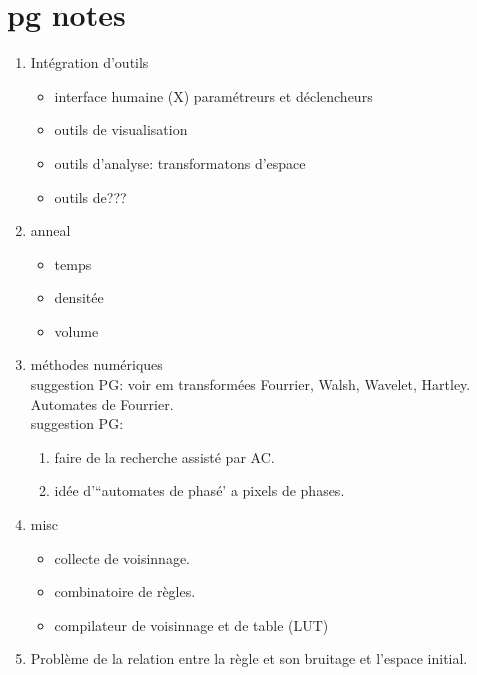 \chapter{pg notes}

\begin{enumerate}
        \item Int\'egration d'outils
        \begin{itemize}
                \item interface humaine (X) param\'etreurs et d\'eclencheurs
                \item outils de visualisation
                \item outils d'analyse: transformatons d'espace
                \item outils de???
        \end{itemize}
        \item anneal
        \begin{itemize}
                \item temps
                \item densit\'ee
                \item volume
        \end{itemize}
        \item m\'ethodes num\'eriques\\
                suggestion PG: voir {em transform\'ees}
                Fourrier, Walsh, Wavelet, Hartley.
                Automates de Fourrier.\\
                suggestion PG:
                \begin{enumerate}
                        \item faire de la recherche assist\'e par AC.
                        \item id\'ee d'``automates de phas\'e' a pixels de phases.
                \end{enumerate}
        \item misc
        \begin{itemize}
                \item collecte de voisinnage.
                \item combinatoire de r\`egles.
                \item compilateur de voisinnage et de table (LUT)
        \end{itemize}
        \item Probl\`eme de la relation entre la r\`egle et son bruitage
                et l'espace initial.\\

\end{enumerate}
